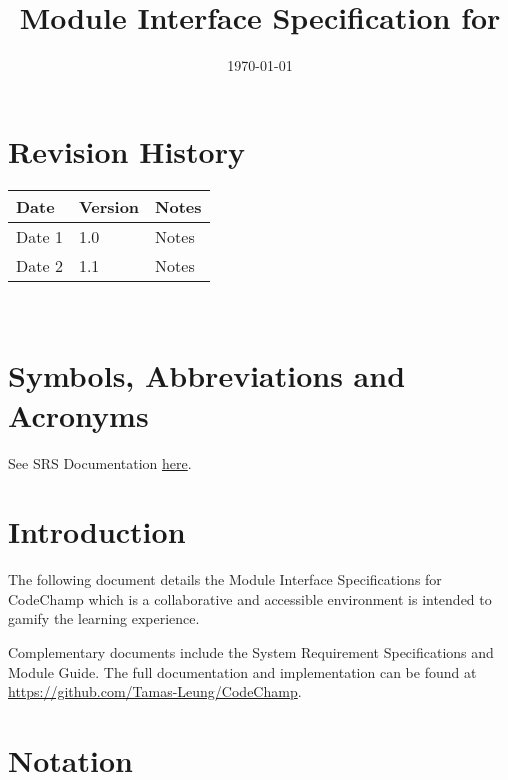 \documentclass[12pt, titlepage]{article}
\begin{document}
\title{Module Interface Specification for \progname{}}

\author{\authname}

\date{\today}

\maketitle


\section{Revision History}

\begin{tabularx}{\textwidth}{p{3cm}p{2cm}X}
\toprule {\bf Date} & {\bf Version} & {\bf Notes}\\
\midrule
Date 1 & 1.0 & Notes\\
Date 2 & 1.1 & Notes\\
\bottomrule
\end{tabularx}

~\newpage

\section{Symbols, Abbreviations and Acronyms}

See SRS Documentation \href{https://github.com/Tamas-Leung/CodeChamp/tree/main/docs/SRS}{here}.



\newpage

\tableofcontents

\newpage


\section{Introduction}

The following document details the Module Interface Specifications for CodeChamp which is a collaborative and accessible environment is intended to gamify the learning experience.

Complementary documents include the System Requirement Specifications
and Module Guide.  The full documentation and implementation can be
found at \url{https://github.com/Tamas-Leung/CodeChamp}. 

\section{Notation}
\end{document}
